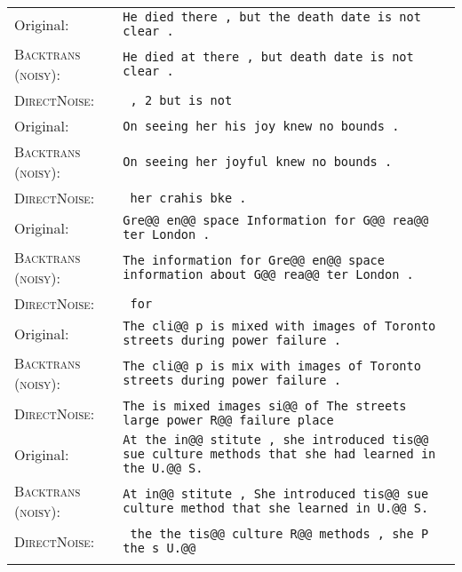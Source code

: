 \documentclass[11pt,a4paper]{article}
\newcommand{\mask}{}
\newcommand{\backtrans}{\textsc{Backtrans (noisy)}}
\newcommand{\directnoise}{\textsc{DirectNoise}}
\begin{document}
\begin{figure*}[h]
\centering
\tabcolsep=1pt
\small
\begin{tabular}{lp{110mm}}
  \toprule
   Original: & \texttt{He died there , but the death date is not clear .} \\
   \backtrans{}: & \texttt{He died at there , but death date is not clear .} \\
   \directnoise{}: & \texttt{\mask{} \mask{} \mask{} , 2 but \mask{} \mask{} \mask{} is not \mask{} \mask{}} \\
   \midrule
   Original: & \texttt{On seeing her his joy knew no bounds .}\\
   \backtrans{}: & \texttt{On seeing her joyful knew no bounds .}\\
   \directnoise{}: & \texttt{\mask{} \mask{} her crahis \mask{} \mask{} \mask{} bke \mask{} .}\\
   \midrule
   Original: & \texttt{Gre@@ en@@ space Information for G@@ rea@@ ter London .} \\
   \backtrans{}: & \texttt{The information for Gre@@ en@@ space information about G@@ rea@@ ter London .} \\
   \directnoise{}: & \texttt{\mask{} \mask{} \mask{} for \mask{} \mask{} \mask{} \mask{}} \\
   \midrule
   Original: & \texttt{The cli@@ p is mixed with images of Toronto streets during power failure .} \\
   \backtrans{}: & \texttt{The cli@@ p is mix with images of Toronto streets during power failure .} \\
   \directnoise{}: & \texttt{The \mask{} is mixed \mask{} images si@@ of The \mask{} streets large \mask{} power R@@ failure place \mask{}} \\
   \midrule
   Original: & \texttt{At the in@@ stitute , she introduced tis@@ sue culture methods that she had learned in the U.@@ S.} \\
   \backtrans{}: & \texttt{At in@@ stitute , She introduced tis@@ sue culture method that she learned in U.@@ S.} \\
   \directnoise{}: & \texttt{\mask{} the the \mask{} \mask{} \mask{} \mask{} tis@@ culture R@@ methods , she P \mask{} the s U.@@ \mask{}} \\
   \bottomrule
   \vspace{-5.0pt}\\
  \end{tabular}
  \vspace{-10.0pt}
\caption{Examples of sentences generated by \backtrans{} and \directnoise{} methods.}
\label{fig:noise-example-appendix}
\end{figure*}
\end{document}
